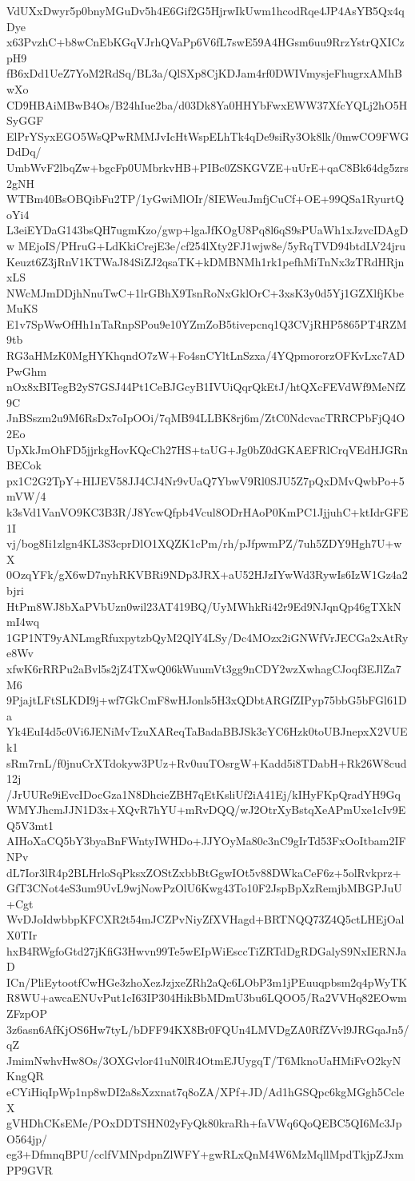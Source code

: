 VdUXxDwyr5p0bnyMGuDv5h4E6Gif2G5HjrwIkUwm1hcodRqe4JP4AsYB5Qx4qDye
x63PvzhC+b8wCnEbKGqVJrhQVaPp6V6fL7swE59A4HGsm6uu9RrzYstrQXICzpH9
fB6xDd1UeZ7YoM2RdSq/BL3a/QlSXp8CjKDJam4rf0DWIVmysjeFhugrxAMhBwXo
CD9HBAiMBwB4Os/B24hIue2ba/d03Dk8Ya0HHYbFwxEWW37XfcYQLj2hO5HSyGGF
ElPrYSyxEGO5WsQPwRMMJvIcHtWspELhTk4qDe9siRy3Ok8lk/0mwCO9FWGDdDq/
UmbWvF2lbqZw+bgcFp0UMbrkvHB+PIBc0ZSKGVZE+uUrE+qaC8Bk64dg5zrs2gNH
WTBm40BsOBQibFu2TP/1yGwiMlOIr/8IEWeuJmfjCuCf+OE+99QSa1RyurtQoYi4
L3eiEYDaG143bsQH7ugmKzo/gwp+lgaJfKOgU8Pq8l6qS9sPUaWh1xJzvcIDAgDw
MEjoIS/PHruG+LdKkiCrejE3e/cf254lXty2FJ1wjw8e/5yRqTVD94btdLV24jru
Keuzt6Z3jRnV1KTWaJ84SiZJ2qsaTK+kDMBNMh1rk1pefhMiTnNx3zTRdHRjnxLS
NWcMJmDDjhNnuTwC+1lrGBhX9TsnRoNxGklOrC+3xsK3y0d5Yj1GZXlfjKbeMuKS
E1v7SpWwOfHh1nTaRnpSPou9e10YZmZoB5tivepcnq1Q3CVjRHP5865PT4RZM9tb
RG3aHMzK0MgHYKhqndO7zW+Fo4snCYltLnSzxa/4YQpmororzOFKvLxc7ADPwGhm
nOx8xBITegB2yS7GSJ44Pt1CeBJGcyB1IVUiQqrQkEtJ/htQXcFEVdWf9MeNfZ9C
JnBSszm2u9M6RsDx7oIpOOi/7qMB94LLBK8rj6m/ZtC0NdcvacTRRCPbFjQ4O2Eo
UpXkJmOhFD5jjrkgHovKQcCh27HS+taUG+Jg0bZ0dGKAEFRlCrqVEdHJGRnBECok
px1C2G2TpY+HIJEV58JJ4CJ4Nr9vUaQ7YbwV9Rl0SJU5Z7pQxDMvQwbPo+5mVW/4
k3sVd1VanVO9KC3B3R/J8YcwQfpb4Vcul8ODrHAoP0KmPC1JjjuhC+ktIdrGFE1I
vj/bog8Ii1zlgn4KL3S3cprDlO1XQZK1cPm/rh/pJfpwmPZ/7uh5ZDY9Hgh7U+wX
0OzqYFk/gX6wD7nyhRKVBRi9NDp3JRX+aU52HJzIYwWd3RywIs6IzW1Gz4a2bjri
HtPm8WJ8bXaPVbUzn0wil23AT419BQ/UyMWhkRi42r9Ed9NJqnQp46gTXkNmI4wq
1GP1NT9yANLmgRfuxpytzbQyM2QlY4LSy/Dc4MOzx2iGNWfVrJECGa2xAtRye8Wv
xfwK6rRRPu2aBvl5s2jZ4TXwQ06kWuumVt3gg9nCDY2wzXwhagCJoqf3EJlZa7M6
9PjajtLFtSLKDI9j+wf7GkCmF8wHJonls5H3xQDbtARGfZIPyp75bbG5bFGl61Da
Yk4EuI4d5c0Vi6JENiMvTzuXAReqTaBadaBBJSk3cYC6Hzk0toUBJnepxX2VUEk1
sRm7rnL/f0jnuCrXTdokyw3PUz+Rv0uuTOsrgW+Kadd5i8TDabH+Rk26W8cud12j
/JrUURe9iEvcIDocGza1N8DhcieZBH7qEtKsliUf2iA41Ej/kIHyFKpQradYH9Gq
WMYJhcmJJN1D3x+XQvR7hYU+mRvDQQ/wJ2OtrXyBstqXeAPmUxe1cIv9EQ5V3mt1
AIHoXaCQ5bY3byaBnFWntyIWHDo+JJYOyMa80c3nC9gIrTd53FxOoItbam2IFNPv
dL7Ior3lR4p2BLHrloSqPksxZOStZxbbBtGgwIOt5v88DWkaCeF6z+5olRvkprz+
GfT3CNot4eS3um9UvL9wjNowPzOlU6Kwg43To10F2JspBpXzRemjbMBGPJuU+Cgt
WvDJoIdwbbpKFCXR2t54mJCZPvNiyZfXVHagd+BRTNQQ73Z4Q5ctLHEjOalX0TIr
hxB4RWgfoGtd27jKfiG3Hwvn99Te5wEIpWiEsccTiZRTdDgRDGalyS9NxIERNJaD
ICn/PliEytootfCwHGe3zhoXezJzjxeZRh2aQc6LObP3m1jPEuuqpbsm2q4pWyTK
R8WU+awcaENUvPut1cI63IP304HikBbMDmU3bu6LQOO5/Ra2VVHq82EOwmZFzpOP
3z6asn6AfKjOS6Hw7tyL/bDFF94KX8Br0FQUn4LMVDgZA0RfZVvl9JRGqaJn5/qZ
JmimNwhvHw8Os/3OXGvlor41uN0lR4OtmEJUygqT/T6MknoUaHMiFvO2kyNKngQR
eCYiHiqIpWp1np8wDI2a8sXzxnat7q8oZA/XPf+JD/Ad1hGSQpc6kgMGgh5CcleX
gVHDhCKsEMe/POxDDTSHN02yFyQk80kraRh+faVWq6QoQEBC5QI6Mc3JpO564jp/
eg3+DfmnqBPU/cclfVMNpdpnZlWFY+gwRLxQnM4W6MzMqllMpdTkjpZJxmPP9GVR
